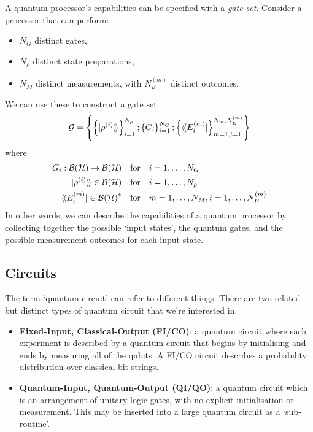 A quantum processor's capabilities can be specified with a \textit{gate set}. Consider a processor
that can perform:
\begin{itemize}
    \item $N_G$ distinct gates,
    \item $N_{\rho}$ distinct state preparations,
    \item $N_M$ distinct measurements, with $N_E^{(m)}$ distinct outcomes.
\end{itemize}
We can use these to construct a gate set
\begin{equation}
    \mathcal{G} = 
    \left\{
        \left\{
            \ket{\rho^{(i)}}\!\rangle
        \right\}^{N_{\rho}}_{i=1} ;
        \left\{
            G_i
        \right\}^{N_G}_{i=1} ;
        \left\{
            \langle\!\bra{E_i^{(m)}}
        \right\}^{N_m, N_E^{(m)}}_{m=1, i=1}
    \right\}
\end{equation}
where
\begin{equation}
    \begin{aligned}
        G_i : \mathcal{B(H)} \to \mathcal{B(H)}  \quad &\text{for} \quad i = 1, \dots, N_G \\
        \ket{\rho^{(i)}}\!\rangle \in \mathcal{B(H)} \quad &\text{for} \quad i = 1, \dots, N_{\rho} \\
        \langle\!\bra{E_i^{(m)}} \in \mathcal{B(H)}^*  \quad &\text{for} \quad m = 1, \dots, N_M, i = 1, \dots, N_E^{(m)} \\
    \end{aligned}
\end{equation}
In other words, we can describe the capabilities of a quantum processor by collecting together the
possible `input states', the quantum gates, and the possible measurement outcomes for each input
state.

\subsection{Circuits}

The term `quantum circuit' can refer to different things. There are two related but distinct types
of quantum circuit that we're interested in.
\begin{itemize}
    \item \textbf{Fixed-Input, Classical-Output (FI/CO)}: a quantum circuit where each experiment is
    described by a quantum circuit that begins by initialising and ends by measuring all of the
    qubits. A FI/CO circuit describes a probability distribution over classical bit strings.
    \item \textbf{Quantum-Input, Quantum-Output (QI/QO)}: a quantum circuit which is an arrangement
    of unitary logic gates, with no explicit initialisation or measurement. This may be inserted
    into a large quantum circuit as a `sub-routine'.
\end{itemize}

